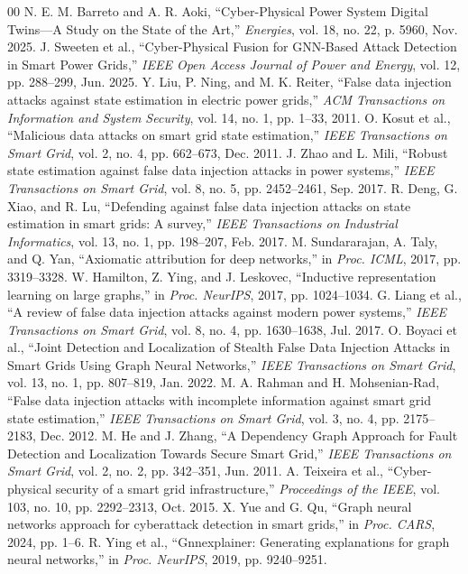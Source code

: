 \documentclass[12pt,a4paper]{report}
\begin{document}
\begin{thebibliography}{00}
 N. E. M. Barreto and A. R. Aoki, ``Cyber-Physical Power System Digital Twins---A Study on the State of the Art,'' \emph{Energies}, vol. 18, no. 22, p. 5960, Nov. 2025.
 J. Sweeten et al., ``Cyber-Physical Fusion for GNN-Based Attack Detection in Smart Power Grids,'' \emph{IEEE Open Access Journal of Power and Energy}, vol. 12, pp. 288--299, Jun. 2025.
 Y. Liu, P. Ning, and M. K. Reiter, ``False data injection attacks against state estimation in electric power grids,'' \emph{ACM Transactions on Information and System Security}, vol. 14, no. 1, pp. 1--33, 2011.
 O. Kosut et al., ``Malicious data attacks on smart grid state estimation,'' \emph{IEEE Transactions on Smart Grid}, vol. 2, no. 4, pp. 662--673, Dec. 2011.
 J. Zhao and L. Mili, ``Robust state estimation against false data injection attacks in power systems,'' \emph{IEEE Transactions on Smart Grid}, vol. 8, no. 5, pp. 2452--2461, Sep. 2017.
 R. Deng, G. Xiao, and R. Lu, ``Defending against false data injection attacks on state estimation in smart grids: A survey,'' \emph{IEEE Transactions on Industrial Informatics}, vol. 13, no. 1, pp. 198--207, Feb. 2017.
 M. Sundararajan, A. Taly, and Q. Yan, ``Axiomatic attribution for deep networks,'' in \emph{Proc. ICML}, 2017, pp. 3319--3328.
 W. Hamilton, Z. Ying, and J. Leskovec, ``Inductive representation learning on large graphs,'' in \emph{Proc. NeurIPS}, 2017, pp. 1024--1034.
 G. Liang et al., ``A review of false data injection attacks against modern power systems,'' \emph{IEEE Transactions on Smart Grid}, vol. 8, no. 4, pp. 1630--1638, Jul. 2017.
 O. Boyaci et al., ``Joint Detection and Localization of Stealth False Data Injection Attacks in Smart Grids Using Graph Neural Networks,'' \emph{IEEE Transactions on Smart Grid}, vol. 13, no. 1, pp. 807--819, Jan. 2022.
 M. A. Rahman and H. Mohsenian-Rad, ``False data injection attacks with incomplete information against smart grid state estimation,'' \emph{IEEE Transactions on Smart Grid}, vol. 3, no. 4, pp. 2175--2183, Dec. 2012.
 M. He and J. Zhang, ``A Dependency Graph Approach for Fault Detection and Localization Towards Secure Smart Grid,'' \emph{IEEE Transactions on Smart Grid}, vol. 2, no. 2, pp. 342--351, Jun. 2011.
 A. Teixeira et al., ``Cyber-physical security of a smart grid infrastructure,'' \emph{Proceedings of the IEEE}, vol. 103, no. 10, pp. 2292--2313, Oct. 2015.
 X. Yue and G. Qu, ``Graph neural networks approach for cyberattack detection in smart grids,'' in \emph{Proc. CARS}, 2024, pp. 1--6.
 R. Ying et al., ``Gnnexplainer: Generating explanations for graph neural networks,'' in \emph{Proc. NeurIPS}, 2019, pp. 9240--9251.
\end{thebibliography}
\end{document}
